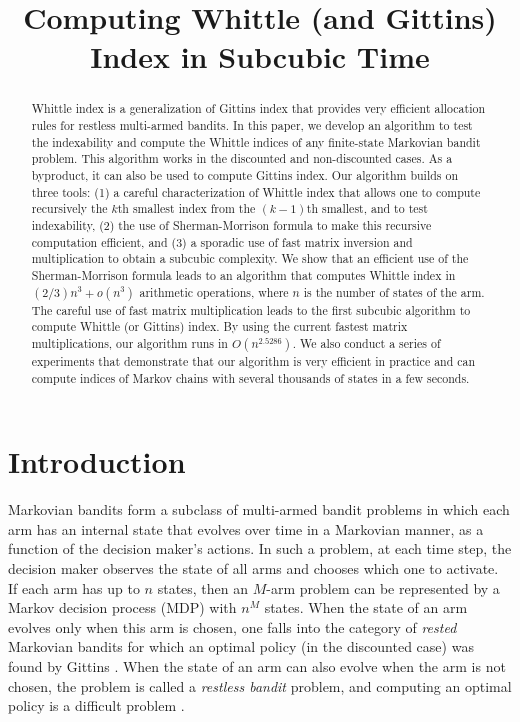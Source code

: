 \documentclass[acmsmall,screen,anonymous]{acmart}
\title[Whittle Index]{Computing Whittle (and Gittins) Index in Subcubic Time}
\begin{document}
\begin{abstract}
    Whittle index is a generalization of Gittins index that provides very efficient allocation rules for restless multi-armed bandits. In this paper, we develop an algorithm to test the indexability and compute the Whittle indices of any finite-state Markovian bandit problem. This algorithm works in the discounted and non-discounted cases.  As a byproduct, it can also be used to compute Gittins index. Our algorithm builds on three tools: (1) a careful characterization of Whittle index that allows one to compute recursively the $k$th smallest index from the $(k-1)$th smallest, and to test indexability, (2) the use of Sherman-Morrison formula to make this recursive computation efficient, and (3) a sporadic use of fast matrix inversion and multiplication to obtain a subcubic complexity. We show that an efficient use of the Sherman-Morrison formula leads to an algorithm that computes Whittle index in $(2/3)n^3 + o(n^3)$ arithmetic operations, where $n$ is the number of states of the arm.  The careful use of fast matrix multiplication leads to the first subcubic algorithm to compute Whittle (or Gittins) index. By using the current fastest matrix multiplications, our algorithm runs in $O(n^{2.5286})$. We also conduct a series of experiments that demonstrate that our algorithm is very efficient in practice and can compute indices of Markov chains with several thousands of states in a few seconds.
\end{abstract}

\maketitle

\newtheorem{thm}{Theorem}
\newtheorem{lem}[]{Lemma}
\newtheorem{asmp}[]{Assumption}
\newtheorem{prob}[]{Problem}



\section{Introduction}
\label{sec:intro}

Markovian bandits form a subclass of multi-armed bandit problems in which each arm has an internal state that evolves over time in a Markovian manner, as a function of the decision maker's actions.  In such a problem, at each time step, the decision maker observes the state of all arms and chooses which one to activate. If each arm has up to $n$ states, then an $M$-arm problem can be represented by a Markov decision process (MDP) with $n^M$ states.  When the state of an arm evolves only when this arm is chosen, one falls into the category of \emph{rested} Markovian bandits for which an optimal policy (in the discounted case) was found by Gittins \cite{gittinsBanditProcessesDynamic1979a}.  When the state of an arm can also evolve when the arm is not chosen, the problem is called a \emph{restless bandit} problem, and computing an optimal policy is a difficult problem \cite{papadimitriou1994complexity}.
\end{document}
